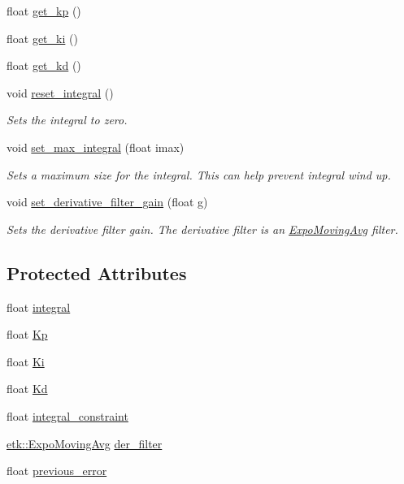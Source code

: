 \begin{DoxyCompactItemize}
float \hyperlink{classetk_1_1_p_i_d_controller_aac7e4d36115040c886e246c9d12ae162}{get\-\_\-kp} ()
\item 
float \hyperlink{classetk_1_1_p_i_d_controller_a8fe8587acf149580d35b30d2b83755c2}{get\-\_\-ki} ()
\item 
float \hyperlink{classetk_1_1_p_i_d_controller_a48e86408c7eb812974312161cea797a0}{get\-\_\-kd} ()
\item 
void \hyperlink{classetk_1_1_p_i_d_controller_a02af725f99fb1e0131674f7602fd635e}{reset\-\_\-integral} ()
\begin{DoxyCompactList}\small\item\em Sets the integral to zero. \end{DoxyCompactList}\item 
void \hyperlink{classetk_1_1_p_i_d_controller_a803cdc7e6e9a2cf9f6216380bbc2c524}{set\-\_\-max\-\_\-integral} (float imax)
\begin{DoxyCompactList}\small\item\em Sets a maximum size for the integral. This can help prevent integral wind up. \end{DoxyCompactList}\item 
void \hyperlink{classetk_1_1_p_i_d_controller_a3b1f378dc6c1b235c70df6703c9d293d}{set\-\_\-derivative\-\_\-filter\-\_\-gain} (float g)
\begin{DoxyCompactList}\small\item\em Sets the derivative filter gain. The derivative filter is an \hyperlink{classetk_1_1_expo_moving_avg}{Expo\-Moving\-Avg} filter. \end{DoxyCompactList}\end{DoxyCompactItemize}
\subsection*{Protected Attributes}
\begin{DoxyCompactItemize}
\item 
float \hyperlink{classetk_1_1_p_i_d_controller_a3aed53bb90e1600d440e236ab0d6f4b9}{integral}
\item 
float \hyperlink{classetk_1_1_p_i_d_controller_ad6c1bf5a48b506990dfc8fbf47010a5c}{Kp}
\item 
float \hyperlink{classetk_1_1_p_i_d_controller_a36cff2f631d3efb194f3e392927cb543}{Ki}
\item 
float \hyperlink{classetk_1_1_p_i_d_controller_a36051f342bbadb57693b941e4eb9e353}{Kd}
\item 
float \hyperlink{classetk_1_1_p_i_d_controller_a33d2b8813eea388174ca01d4fd7ec148}{integral\-\_\-constraint}
\item 
\hyperlink{classetk_1_1_expo_moving_avg}{etk\-::\-Expo\-Moving\-Avg} \hyperlink{classetk_1_1_p_i_d_controller_a73e3b7bc002861712facbb017bfe6e6d}{der\-\_\-filter}
\item 
float \hyperlink{classetk_1_1_p_i_d_controller_a6798422061ebe557fc4a48bf7da41dff}{previous\-\_\-error}
\end{DoxyCompactItemize}


